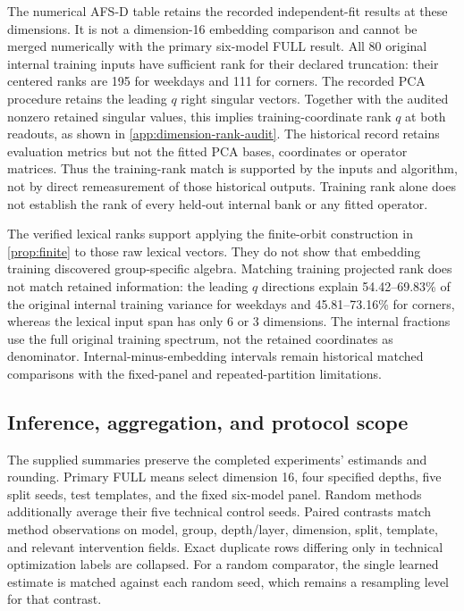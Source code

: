 The numerical AFS-D table retains the recorded independent-fit results at these dimensions. It is not a dimension-16 embedding comparison and cannot be merged numerically with the primary six-model FULL result. All 80 original internal training inputs have sufficient rank for their declared truncation: their centered ranks are 195 for weekdays and 111 for corners. The recorded PCA procedure retains the leading $q$ right singular vectors. Together with the audited nonzero retained singular values, this implies training-coordinate rank $q$ at both readouts, as shown in \cref{app:dimension-rank-audit}. The historical record retains evaluation metrics but not the fitted PCA bases, coordinates or operator matrices. Thus the training-rank match is supported by the inputs and algorithm, not by direct remeasurement of those historical outputs. Training rank alone does not establish the rank of every held-out internal bank or any fitted operator.

The verified lexical ranks support applying the finite-orbit construction in \cref{prop:finite} to those raw lexical vectors. They do not show that embedding training discovered group-specific algebra. Matching training projected rank does not match retained information: the leading $q$ directions explain 54.42--69.83\% of the original internal training variance for weekdays and 45.81--73.16\% for corners, whereas the lexical input span has only 6 or 3 dimensions. The internal fractions use the full original training spectrum, not the retained coordinates as denominator. Internal-minus-embedding intervals remain historical matched comparisons with the fixed-panel and repeated-partition limitations.

\subsection{Inference, aggregation, and protocol scope}
\label{app:inference}
The supplied summaries preserve the completed experiments' estimands and rounding. Primary FULL means select dimension 16, four specified depths, five split seeds, test templates, and the fixed six-model panel. Random methods additionally average their five technical control seeds. Paired contrasts match method observations on model, group, depth/layer, dimension, split, template, and relevant intervention fields. Exact duplicate rows differing only in technical optimization labels are collapsed. For a random comparator, the single learned estimate is matched against each random seed, which remains a resampling level for that contrast.

